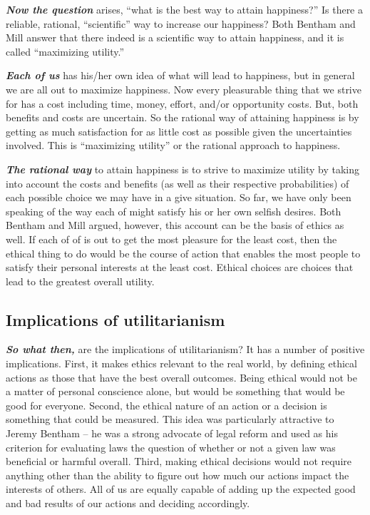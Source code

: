 \documentclass[
  12pt, openany]{book}
\theoremstyle{definition}
\theoremstyle{definition}
\theoremstyle{definition}
\theoremstyle{definition}
\theoremstyle{remark}
\begin{document}
\textbf{\emph{Now the question}} arises, ``what is the best way to attain happiness?'' Is there a reliable, rational, ``scientific'' way to increase our happiness? Both Bentham and Mill answer that there indeed is a scientific way to attain happiness, and it is called ``maximizing utility.''

\textbf{\emph{Each of us}} has his/her own idea of what will lead to happiness, but in general we are all out to maximize happiness. Now every pleasurable thing that we strive for has a cost including time, money, effort, and/or opportunity costs. But, both benefits and costs are uncertain. So the rational way of attaining happiness is by getting as much satisfaction for as little cost as possible given the uncertainties involved. This is ``maximizing utility'' or the rational approach to happiness.

\textbf{\emph{The rational way}} to attain happiness is to strive to maximize utility by taking into account the costs and benefits (as well as their respective probabilities) of each possible choice we may have in a give situation. So far, we have only been speaking of the way each of might satisfy his or her own selfish desires. Both Bentham and Mill argued, however, this account can be the basis of ethics as well. If each of of is out to get the most pleasure for the least cost, then the ethical thing to do would be the course of action that enables the most people to satisfy their personal interests at the least cost. Ethical choices are choices that lead to the greatest overall utility.

\hypertarget{implications-of-utilitarianism}{%
\subsection*{Implications of utilitarianism}\label{implications-of-utilitarianism}}


\textbf{\emph{So what then,}} are the implications of utilitarianism? It has a number of positive implications. First, it makes ethics relevant to the real world, by defining ethical actions as those that have the best overall outcomes. Being ethical would not be a matter of personal conscience alone, but would be something that would be good for everyone. Second, the ethical nature of an action or a decision is something that could be measured. This idea was particularly attractive to Jeremy Bentham -- he was a strong advocate of legal reform and used as his criterion for evaluating laws the question of whether or not a given law was beneficial or harmful overall. Third, making ethical decisions would not require anything other than the ability to figure out how much our actions impact the interests of others. All of us are equally capable of adding up the expected good and bad results of our actions and deciding accordingly.
\end{document}

